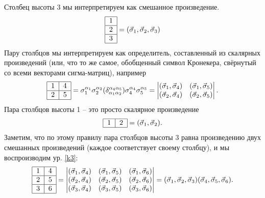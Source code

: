 \documentclass[]{article}
\renewcommand{\[}{\begin{equation}}
\renewcommand{\]}{\end{equation}}
\begin{document}
Столбец высоты 3 мы интерпретируем как смешанное произведение.
\[
\begin{tabular}{ | l | }
\hline
1 \\ \hline
2 \\ \hline
3 \\
\hline
\end{tabular} = (\vec \sigma_1, \vec \sigma_2, \vec \sigma_3)
\label{k4}
\]
Пару столбцов мы интерпретируем как определитель, составленный из скалярных произведений (или, что то же самое, обобщенный символ Кронекера\cite{kronecker_wiki}, свёрнутый со всеми векторами сигма-матриц), например
\[
\begin{tabular}{ |l|l| }
\hline
1 & 4 \\ \hline
2 & 5\\
\hline
\end{tabular}
 =
 \sigma_1^{\alpha_1} \sigma_2^{\alpha_2}
 (\delta_{\alpha_1\alpha_2}^{\alpha_4\alpha_5})
 \sigma_4^{\alpha_4} \sigma_5^{\alpha_5}
 =
\begin{vmatrix}
(\vec\sigma_1,\vec\sigma_4) & (\vec\sigma_1,\vec\sigma_5)\\
(\vec\sigma_2,\vec\sigma_4) & (\vec\sigma_2,\vec\sigma_5)\\
\end{vmatrix}.
\label{k5}
\]
Пара столбцов высоты 1 -- это просто скалярное произведение
\[
\begin{tabular}{ |l|l| }
\hline
1 & 2 \\
\hline
\end{tabular}
= (\vec \sigma_1, \vec \sigma_2).
\label{k6}
\]
Заметим, что по этому правилу пара столбцов высоты 3 равна произведению двух смешанных произведений (каждое соответствует  своему столбцу), и мы воспроизводим ур. \eqref{k3}:
\[
\begin{tabular}{ |l|l| }
\hline
1 & 4 \\ \hline
2 & 5\\ \hline
3 & 6\\
\hline
\end{tabular}
=
\begin{vmatrix}
(\vec\sigma_1,\vec\sigma_4) & (\vec\sigma_1,\vec\sigma_5) & (\vec\sigma_1,\vec\sigma_6) \\
(\vec\sigma_2,\vec\sigma_4) & (\vec\sigma_2,\vec\sigma_5) & (\vec\sigma_2,\vec\sigma_6) \\
(\vec\sigma_3,\vec\sigma_4) & (\vec\sigma_3,\vec\sigma_5) & (\vec\sigma_3,\vec\sigma_6) \\
\end{vmatrix}
=
(\vec \sigma_1, \vec \sigma_2, \vec \sigma_3)
(\vec \sigma_4, \vec \sigma_5, \vec \sigma_6).
\label{k7}
\]
\end{document}
